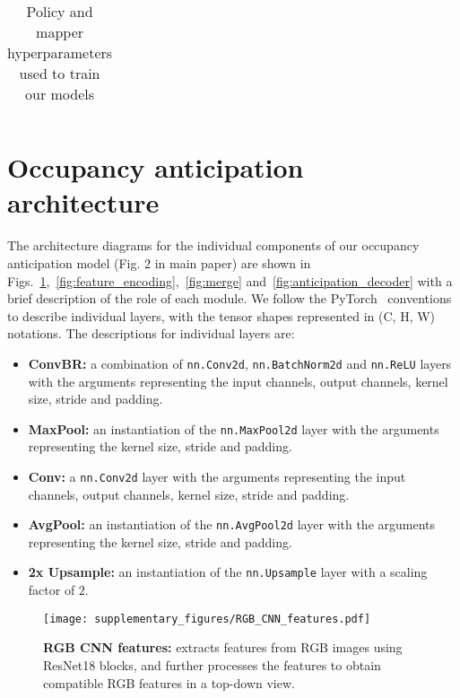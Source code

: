 \documentclass[runningheads]{llncs}
\newcommand{\code}[1]{\texttt{\small #1}}
\begin{document}
\begin{table}[ht!]
\begin{tabular}{@{}ll@{}}
\bottomrule
\end{tabular}
\caption{Policy and mapper hyperparameters used to train our models}
\label{tab:hyperparameters}
\end{table}


\section{Occupancy anticipation architecture}
\label{sec:occupancy_anticipation_architecture}
The architecture diagrams for the individual components of our occupancy anticipation model (Fig. 2 in main paper) are shown in Figs.~\ref{fig:rgb_cnn_features},~\ref{fig:feature_encoding},~\ref{fig:merge} and~\ref{fig:anticipation_decoder} with a brief description of the role of each module. We follow the PyTorch~\cite{NEURIPS2019_9015} conventions to describe individual layers, with the tensor shapes represented in (C, H, W) notations. The descriptions for individual layers are:

\begin{itemize}
    \item \textbf{ConvBR:} a combination of \code{nn.Conv2d}, \code{nn.BatchNorm2d} and \code{nn.ReLU} layers with the arguments representing the input channels, output channels, kernel size, stride and padding.
    \item \textbf{MaxPool:} an instantiation of the \code{nn.MaxPool2d} layer with the arguments representing the kernel size, stride and padding.
    \item \textbf{Conv:} a \code{nn.Conv2d} layer with the arguments representing the input channels, output channels, kernel size, stride and padding.
    \item \textbf{AvgPool:} an instantiation of the \code{nn.AvgPool2d} layer with the arguments representing the kernel size, stride and padding.
    \item \textbf{2x Upsample:} an instantiation of the \code{nn.Upsample} layer with a scaling factor of $2$.
\end{itemize}

\begin{figure}[ht!]
    \centering
    \texttt{[image: supplementary\_figures/RGB\_CNN\_features.pdf]}
    \caption{\small\textbf{RGB CNN features:} extracts features from RGB images using ResNet18 blocks, and further processes the features to obtain compatible RGB features in a top-down view.}
    \label{fig:rgb_cnn_features}
\end{figure}
\end{document}

